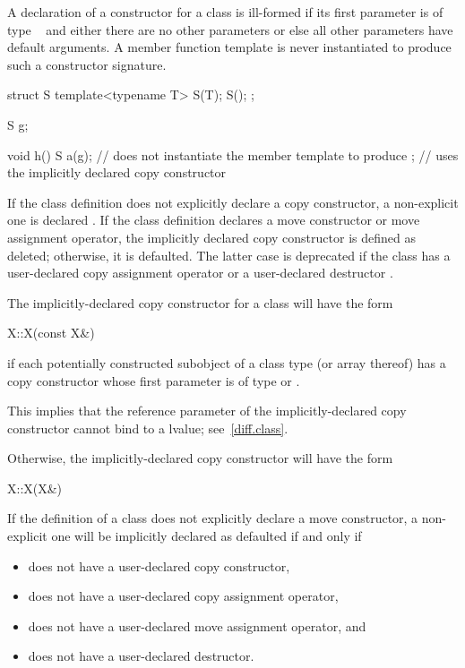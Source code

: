 \pnum
A declaration of a constructor for a class
is ill-formed if its first parameter is of type
\cv{}~
and either there are no other parameters or else all other parameters have
default arguments.
A member function template is never instantiated to
produce such a constructor signature.
\begin{example}
\begin{codeblock}
struct S {
  template<typename T> S(T);
  S();
};

S g;

void h() {
  S a(g);           // does not instantiate the member template to produce ;
                    // uses the implicitly declared copy constructor
}
\end{codeblock}
\end{example}

\pnum
If the class definition does not explicitly declare a copy constructor,
a non-explicit one is declared .
If the class definition declares a move
constructor or move assignment operator, the implicitly declared copy
constructor is defined as deleted; otherwise, it is
defaulted.
The latter case is deprecated if the class has a user-declared copy assignment
operator or a user-declared destructor .

\pnum
The implicitly-declared copy constructor for a class
will have the form
\begin{codeblock}
X::X(const X&)
\end{codeblock}
if each potentially constructed subobject of a class type
(or array thereof)
has a copy constructor whose first parameter is of type
or
.
\begin{footnote}
This implies that the reference parameter of the
implicitly-declared copy constructor
cannot bind to a
lvalue; see~\ref{diff.class}.
\end{footnote}
Otherwise, the implicitly-declared copy constructor will have the form
\begin{codeblock}
X::X(X&)
\end{codeblock}

\pnum
{}%
If the definition of a class  does not explicitly declare
a move constructor, a non-explicit one will be
implicitly declared as defaulted if and only if
\begin{itemize}
\item
{} does not have a user-declared copy constructor,

\item
{} does not have a user-declared copy assignment operator,

\item
{} does not have a user-declared move assignment operator, and

\item
{} does not have a user-declared destructor.
\end{itemize}

